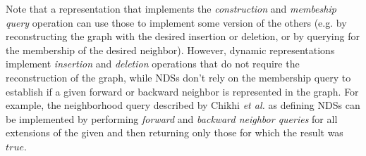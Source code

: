 Note that a representation that implements the \emph{construction} and \emph{membeship query} operation can use those to implement some version of the others (e.g. by reconstructing the graph with the desired insertion or deletion, or by querying for the membership of the desired neighbor). However, dynamic representations implement \emph{insertion} and \emph{deletion} operations that do not require the reconstruction of the graph, while NDSs don't rely on the membership query to establish if a given forward or backward neighbor is represented in the graph. For example, the neighborhood query described by Chikhi \emph{et al.} \cite{Chikhi2014} as defining NDSs can be implemented by performing \emph{forward} and \emph{backward neighbor queries} for all extensions of the given \kmer and then returning only those for which the result was $\mathit{true}$.